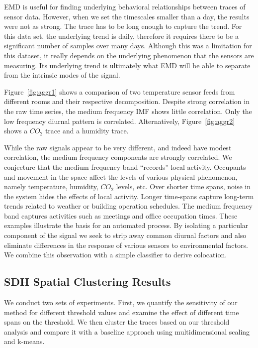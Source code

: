 EMD is useful for finding underlying behavioral relationships between traces of sensor data.  However,
when we set the timescales smaller than a day, the results were not as strong.
The trace has to be long enough to capture the trend.  For this data set, the underlying
trend is daily, therefore it requires there to be a significant number of samples over many days.
Although this was a limitation for this dataset, it really depends on the underlying phenomenon that
the sensors are measuring.  Its underlying trend is ultimately what EMD will be able to separate
from the intrinsic modes of the signal.


Figure~\ref{fig:aggr1} shows a comparison of two temperature sensor feeds from different rooms and their respective
decomposition.  Despite strong correlation in the raw time series, the medium frequency IMF shows little correlation.
Only the low frequency diurnal pattern is correlated.  Alternatively,  Figure~\ref{fig:aggr2} shows a $CO_{2}$ trace and a humidity trace.

While the raw signals appear to be very different, and indeed have modest correlation, the medium frequency components
are strongly correlated.  We conjecture that the medium frequency band ``records'' local activity.  Occupants
and movement in the space affect the levels of various physical phenomenon, namely temperature, humidity, $CO_{2}$ levels, etc.
Over shorter time spans, noise in the system hides the effects of local activity.  Longer time-spans capture long-term trends 
related to weather or building operation schedules.  The medium frequency band
captures activities such as meetings and office occupation times.  
These examples illustrate the basis for an automated process.  By isolating a particular component of the signal
we seek to strip away common diurnal factors and also eliminate differences in the response of various sensors to environmental factors.
We combine this observation with a simple classifier to derive colocation.






\subsection{SDH Spatial Clustering Results}
We conduct two sets of experiments. First, we quantify the sensitivity of our method for different threshold values 
and examine the effect of different time spans on the threshold. We then cluster the traces based on our threshold analysis 
and compare it with a baseline approach using multidimensional scaling and k-means.


